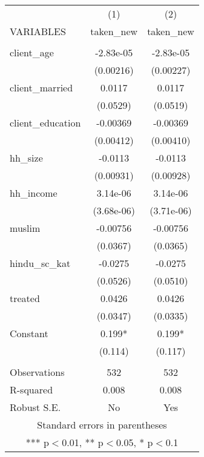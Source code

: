 \begin{tabular}{lcc} \hline
 & (1) & (2) \\
VARIABLES & taken\_new & taken\_new \\ \hline
 &  &  \\
client\_age & -2.83e-05 & -2.83e-05 \\
 & (0.00216) & (0.00227) \\
client\_married & 0.0117 & 0.0117 \\
 & (0.0529) & (0.0519) \\
client\_education & -0.00369 & -0.00369 \\
 & (0.00412) & (0.00410) \\
hh\_size & -0.0113 & -0.0113 \\
 & (0.00931) & (0.00928) \\
hh\_income & 3.14e-06 & 3.14e-06 \\
 & (3.68e-06) & (3.71e-06) \\
muslim & -0.00756 & -0.00756 \\
 & (0.0367) & (0.0365) \\
hindu\_sc\_kat & -0.0275 & -0.0275 \\
 & (0.0526) & (0.0510) \\
treated & 0.0426 & 0.0426 \\
 & (0.0347) & (0.0335) \\
Constant & 0.199* & 0.199* \\
 & (0.114) & (0.117) \\
 &  &  \\
Observations & 532 & 532 \\
R-squared & 0.008 & 0.008 \\
 Robust S.E. & No & Yes \\ \hline
\multicolumn{3}{c}{ Standard errors in parentheses} \\
\multicolumn{3}{c}{ *** p$<$0.01, ** p$<$0.05, * p$<$0.1} \\
\end{tabular}
